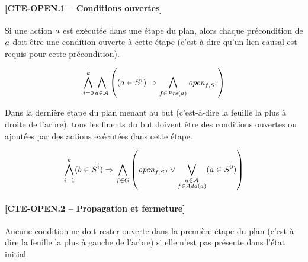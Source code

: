 \paragraph*{[CTE-OPEN.1 -- Conditions ouvertes]}
Si une action $a$ est exécutée dans une étape du plan, alors chaque précondition de $a$ doit être une condition ouverte à cette étape (c'est-à-dire qu'un lien causal est requis pour cette précondition).

\begin{small}
\[ \bigwedge\limits_{\substack{i=0}}^{k} \bigwedge\limits_{\substack{a \in \mathcal{A}}} \left((a \in S^{i}) \Rightarrow \bigwedge\limits_{\substack{f\in \mathit{Pre}(a)}} \textit{open}_{f,S^{i}}\right) \]
\end{small}

Dans la dernière étape du plan menant au but (c'est-à-dire la feuille la plus à droite de l'arbre), tous les fluents du but doivent être des conditions ouvertes ou ajoutées par des actions exécutées dans cette étape.

\begin{small}
\[ \bigwedge\limits_{\substack{i=1}}^{k}(b \in S^{i}) \Rightarrow \bigwedge\limits_{\substack{f\in G}} \left(\textit{open}_{f,S^{0}} \vee \bigvee\limits_{\substack{a \in \mathcal{A} \\ f \in \mathit{Add}(a)}} (a \in S^{0})\right) \]
\end{small}

\paragraph*{[CTE-OPEN.2 -- Propagation et fermeture]}

Aucune condition ne doit rester ouverte dans la première étape du plan (c'est-à-dire la feuille la plus à gauche de l'arbre) si elle n'est pas présente dans l'état initial.

